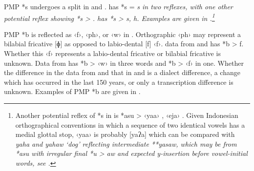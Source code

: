 PMP *s undergoes a split in  and .
 has *s = \it{s} in two reflexes,
with one other potential reflex showing *s > {\0}.
 has *s > \it{s, h}.
Examples are given in .\footnote{
		Another potential
		reflex of *s in  is *asu > ‹yaa› \citep[33]{Rado2021},
		‹eja› \citep{vonRosenberg1867}.
		Given Indonesian orthographical conventions in which a sequence
		of two identical vowels has a medial glottal stop,
		‹yaa› is probably [yaʔa] which can be compared with 
		\it{yaha} and  \it{yahaw} ‘dog’ reflecting intermediate **yasaw,
		which may be from *asu with irregular final *u > \it{aw}
		and expected \it{y-}insertion before vowel-initial words,
		see .} 


\largerpage
PMP *b is reflected as ‹f›,
‹ph›, or ‹w› in .
Orthographic ‹ph› may represent a bilabial fricative [ɸ]
as opposed to labio-dental [f] ‹f›.
 data from \citet{Ohoiwutun2021}
and \citet{Rado2021} has *b > f.
Whether this ‹f› represents a labio-dental fricative or
bilabial fricative is unknown.
Data from \citet{vonRosenberg1867} has *b > ‹w› in three
words and *b > ‹f› in one.
Whether the difference in the data from \citet{vonRosenberg1867}
and that in \citet{Ohoiwutun2021}
and \citet{Rado2021} is a dialect difference, a change which
has occurred in the last 150 years, or only a transcription difference is unknown.
Examples of PMP *b are given in .


